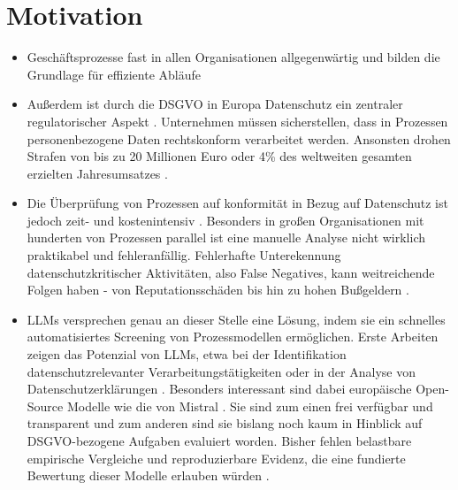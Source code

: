 \section{Motivation}\label{sec:motivation}

\begin{itemize}
    \item Geschäftsprozesse fast in allen Organisationen allgegenwärtig und bilden die Grundlage für effiziente Abläufe
    \item Außerdem ist durch die \ac{DSGVO} in Europa Datenschutz ein zentraler regulatorischer Aspekt \cite{GDPR2016, Capodieci2023BPMNEnabledDP}. Unternehmen müssen sicherstellen, dass in Prozessen personenbezogene Daten rechtskonform verarbeitet werden. Ansonsten drohen Strafen von bis zu 20 Millionen Euro oder 4\% des weltweiten gesamten erzielten Jahresumsatzes \cite{GDPR2016}.
    \item Die Überprüfung von Prozessen auf konformität in Bezug auf Datenschutz ist jedoch zeit- und kostenintensiv \cite{nake2023towards, varela2025business}. Besonders in großen Organisationen mit hunderten von Prozessen parallel ist eine manuelle Analyse nicht wirklich praktikabel und fehleranfällig. Fehlerhafte Unterekennung datenschutzkritischer Aktivitäten, also False Negatives, kann weitreichende Folgen haben - von Reputationsschäden bis hin zu hohen Bußgeldern \cite{nake2023towards}.
    \item \acp{LLM} versprechen genau an dieser Stelle eine Lösung, indem sie ein schnelles automatisiertes Screening von Prozessmodellen ermöglichen. Erste Arbeiten zeigen das Potenzial von \acp{LLM}, etwa bei der Identifikation datenschutzrelevanter Verarbeitungstätigkeiten oder in der Analyse von Datenschutzerklärungen \cite{ciaramella2022leveraging, pragyan2024toward}. Besonders interessant sind dabei europäische Open-Source Modelle wie die von Mistral \cite{mistralai}. Sie sind zum einen frei verfügbar und transparent und zum anderen sind sie bislang noch kaum in Hinblick auf DSGVO-bezogene Aufgaben evaluiert worden. Bisher fehlen belastbare empirische Vergleiche und reproduzierbare Evidenz, die eine fundierte Bewertung dieser Modelle erlauben würden \cite{schwerin2024systematic}.
\end{itemize}